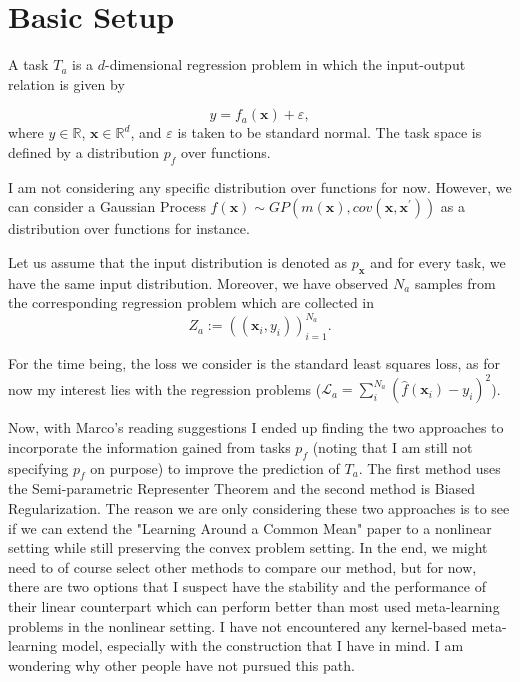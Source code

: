 \documentclass{tran-l}
\theoremstyle{definition}
\theoremstyle{remark}
\numberwithin{equation}{section}
\newcommand{\mR}{\mathbb{R}}
\begin{document}
\section{Basic Setup}

A task $T_a$ is a $d$-dimensional regression problem in which the input-output relation is given by

\begin{equation}\label{eq:data}
y = f_a(\mathbf{x}) + \varepsilon,
\end{equation}
where $y\in\mR$, $\mathbf{x} \in \mR^d$, and $\varepsilon$ is taken to be standard normal.  The task space is defined by a distribution $p_f$ over functions. 

\rem I am not considering any specific distribution over functions for now. However, we can consider a Gaussian Process $f(\mathbf{x}) \sim GP(m(\mathbf{x}), cov(\mathbf{x},\mathbf{x}^\prime))$ as a distribution over functions for instance.

Let us assume that the input distribution is denoted as $p_{\mathbf{x}}$ and for every task, we have the same input distribution. Moreover,  we have observed $N_a$ samples from the corresponding regression problem which are collected in
\begin{equation}
Z_a:=\left((\mathbf{x}_i,y_i)\right)_{i=1}^{N_a}.
\end{equation}

For the time being, the loss we consider is the standard least squares loss, as for now my interest lies with the regression problems ($\mathcal{L}_a=\sum_i^{N_a}(\hat{f}(\mathbf{x}_i)-y_i)^2$).

\rem Now, with Marco's reading suggestions I ended up finding the two approaches to incorporate the information gained from tasks $p_f$ (noting that I am still not specifying $p_f$ on purpose) to improve the prediction of $T_a$. The first method uses the Semi-parametric Representer Theorem and the second method is Biased Regularization. The reason we are only considering these two approaches is to see if we can extend the "Learning Around a Common Mean" paper to a nonlinear setting while still preserving the convex problem setting. In the end, we might need to of course select other methods to compare our method, but for now, there are two options that I suspect have the stability and the performance of their linear counterpart which can perform better than most used meta-learning problems in the nonlinear setting. I have not encountered any kernel-based meta-learning model, especially with the construction that I have in mind. I am wondering why other people have not pursued this path.
\end{document}
